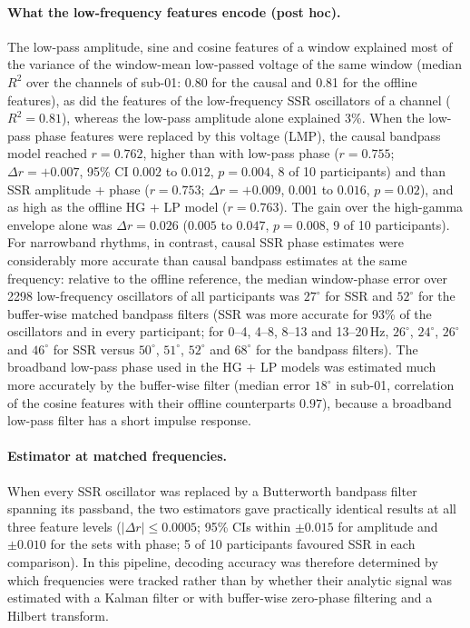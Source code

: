 \documentclass{iopjournal}
\begin{document}
\paragraph{What the low-frequency features encode (post hoc).} The low-pass amplitude, sine and cosine features of a window explained most of the variance of the window-mean low-passed voltage of the same window (median $R^2$ over the channels of sub-01: 0.80 for the causal and 0.81 for the offline features), as did the features of the low-frequency SSR oscillators of a channel ($R^2=0.81$), whereas the low-pass amplitude alone explained 3\%. When the low-pass phase features were replaced by this voltage (LMP), the causal bandpass model reached $r=0.762$, higher than with low-pass phase ($r=0.755$; $\Delta r=+0.007$, 95\% CI $0.002$ to $0.012$, $p=0.004$, 8 of 10 participants) and than SSR amplitude + phase ($r=0.753$; $\Delta r=+0.009$, $0.001$ to $0.016$, $p=0.02$), and as high as the offline HG + LP model ($r=0.763$). The gain over the high-gamma envelope alone was $\Delta r=0.026$ ($0.005$ to $0.047$, $p=0.008$, 9 of 10 participants). For narrowband rhythms, in contrast, causal SSR phase estimates were considerably more accurate than causal bandpass estimates at the same frequency: relative to the offline reference, the median window-phase error over 2298 low-frequency oscillators of all participants was $27^\circ$ for SSR and $52^\circ$ for the buffer-wise matched bandpass filters (SSR was more accurate for 93\% of the oscillators and in every participant; for 0--4, 4--8, 8--13 and 13--20\,Hz, $26^\circ$, $24^\circ$, $26^\circ$ and $46^\circ$ for SSR versus $50^\circ$, $51^\circ$, $52^\circ$ and $68^\circ$ for the bandpass filters). The broadband low-pass phase used in the HG + LP models was estimated much more accurately by the buffer-wise filter (median error $18^\circ$ in sub-01, correlation of the cosine features with their offline counterparts $0.97$), because a broadband low-pass filter has a short impulse response.

\paragraph{Estimator at matched frequencies.} When every SSR oscillator was replaced by a Butterworth bandpass filter spanning its passband, the two estimators gave practically identical results at all three feature levels ($|\Delta r|\le0.0005$; 95\% CIs within $\pm0.015$ for amplitude and $\pm0.010$ for the sets with phase; 5 of 10 participants favoured SSR in each comparison). In this pipeline, decoding accuracy was therefore determined by which frequencies were tracked rather than by whether their analytic signal was estimated with a Kalman filter or with buffer-wise zero-phase filtering and a Hilbert transform.
\end{document}
